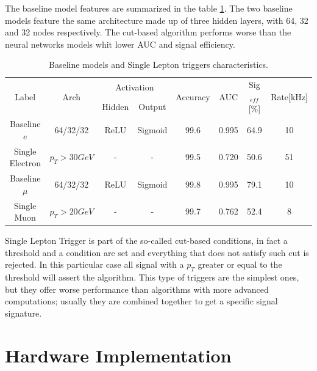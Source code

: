 \documentclass[../../main.tex]{subfiles}
\begin{document}
The baseline model features are summarized in the table \ref{tab:baseline_NN}. The two baseline models feature the same architecture made up of three hidden layers, with 64, 32 and 32 nodes respectively. The cut-based algorithm performs worse than the neural networks models whit lower AUC and signal efficiency.

\begin{center}
    \begin{table}[h]
    \centering
    \begin{tabular}{|c|c|c|c|c|c|c|c|}
        \hline
        \multirow{2}{*}{Label} & \multirow{2}{*}{Arch} & \multicolumn{2}{c|}{Activation} & \multirow{2}{*}{Accuracy} & \multirow{2}{*}{AUC} & \multirow{2}{*}{Sig$_{eff}$[\%]} & \multirow{2}{*}{Rate[kHz]} \\
        \cline{3-4}
        && Hidden & Output& [\%] &&&\\
        \hline
        Baseline $e$ & 64/32/32 & ReLU & Sigmoid & 99.6 & 0.995 & 64.9 & 10 \\
        Single Electron & $p_T>30GeV$ & - & - & 99.5 & 0.720 & 50.6 & 51 \\
        Baseline $\mu$ & 64/32/32 & ReLU & Sigmoid & 99.8 & 0.995 & 79.1 & 10 \\
        Single Muon & $p_T>20GeV$ & - & - & 99.7 & 0.762 & 52.4 & 8  \\
        \hline
    \end{tabular}
    \caption{Baseline models and Single Lepton triggers characteristics.}
    \label{tab:baseline_NN}
    \end{table}
\end{center}

Single Lepton Trigger is part of the so-called cut-based conditions, in fact a threshold and a condition are set and everything that does not satisfy such cut is rejected. In this particular case all signal with a $p_T$ greater or equal to the threshold will assert the algorithm. This type of triggers are the simplest ones, but they offer worse performance than algorithms with more advanced computations; usually they are combined together to get a specific signal signature.

\section{Hardware Implementation}
\label{sec:P2GT_Imp}
\end{document}
